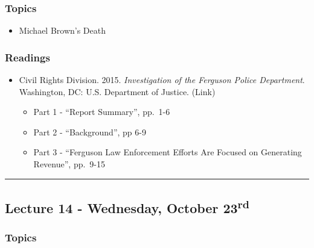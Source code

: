 \documentclass[]{book}
\providecommand{\tightlist}{%
  \setlength{\itemsep}{0pt}\setlength{\parskip}{0pt}}
\begin{document}
\hypertarget{topics-16}{%
\subsubsection*{Topics}\label{topics-16}}

\begin{itemize}
\tightlist
\item
  Michael Brown's Death
\end{itemize}

\hypertarget{readings-15}{%
\subsubsection*{Readings}\label{readings-15}}

\begin{itemize}
\tightlist
\item
  Civil Rights Division. 2015. \emph{Investigation of the Ferguson Police Department}. Washington, DC: U.S. Department of Justice. (Link)

  \begin{itemize}
  \tightlist
  \item
    Part 1 - ``Report Summary'', pp.~1-6
  \item
    Part 2 - ``Background'', pp 6-9
  \item
    Part 3 - ``Ferguson Law Enforcement Efforts Are Focused on Generating Revenue'', pp.~9-15
  \end{itemize}
\end{itemize}

\begin{center}\rule{0.5\linewidth}{\linethickness}\end{center}

\hypertarget{lecture-14---wednesday-october-23rd}{%
\subsection*{\texorpdfstring{Lecture 14 - Wednesday, October 23\textsuperscript{rd}}{Lecture 14 - Wednesday, October 23rd}}\label{lecture-14---wednesday-october-23rd}}

\hypertarget{topics-17}{%
\subsubsection*{Topics}\label{topics-17}}
\end{document}
